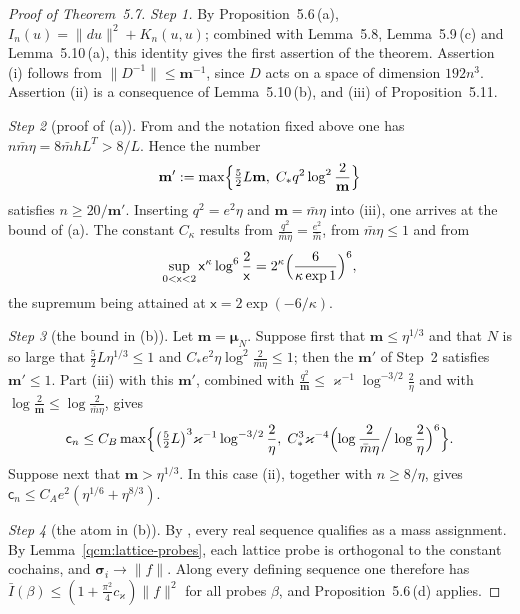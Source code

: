 \documentclass[11pt,letterpaper,reqno]{amsart}
\theoremstyle{definition}
\begin{document}
\begin{proof}[Proof of Theorem~5.7]
\emph{Step 1.}
By Proposition~5.6\,(a), $I_n(u)=\|du\|^2+K_n(u,u)$; combined with Lemma~5.8, Lemma~5.9\,(c) and Lemma~5.10\,(a), this identity gives the first assertion of the theorem.
Assertion (i) follows from $\|D^{-1}\|\le\mathbf m^{-1}$, since $D$ acts on a space of dimension $192n^3$.
Assertion (ii) is a consequence of Lemma~5.10\,(b), and (iii) of Proposition~5.11.

\emph{Step 2} (proof of (a)).
From \cite[Section~6.1]{QEDConstruction} and the notation fixed above one has $n\bar m\eta=8\bar mhL^T>8/L$.
Hence the number
\begin{equation*}
\mathbf m':=\max\Bigl\{\tfrac52L\mathbf m,\;C_*q^2\log^2\frac2{\mathbf m}\Bigr\}
\end{equation*}
satisfies $n\ge20/\mathbf m'$.
Inserting $q^2=e^2\eta$ and $\mathbf m=\bar m\eta$ into (iii), one arrives at the bound of (a).
The constant $C_\kappa$ results from $\frac{q^2}{\bar m\eta}=\frac{e^2}{\bar m}$, from $\bar m\eta\le1$ and from
\begin{equation*}
\sup_{0<\mathsf x<2}\mathsf x^\kappa\log^6\frac2{\mathsf x}=2^\kappa\Bigl(\frac{6}{\kappa\exp1}\Bigr)^6,
\end{equation*}
the supremum being attained at $\mathsf x=2\exp(-6/\kappa)$.

\emph{Step 3} (the bound in (b)).
Let $\mathbf m=\boldsymbol\mu_N$.
Suppose first that $\mathbf m\le\eta^{1/3}$ and that $N$ is so large that $\frac52L\eta^{1/3}\le1$ and $C_*e^2\eta\log^2\frac2{\bar m\eta}\le1$; then the $\mathbf m'$ of Step~2 satisfies $\mathbf m'\le1$.
Part (iii) with this $\mathbf m'$, combined with $\frac{q^2}{\mathbf m}\le\varkappa^{-1}\log^{-3/2}\frac2\eta$ and with $\log\frac2{\mathbf m}\le\log\frac2{\bar m\eta}$, gives
\begin{equation*}
\mathsf c_n\le C_B\max\Bigl\{\bigl(\tfrac52L\bigr)^3\varkappa^{-1}\log^{-3/2}\frac2\eta,\;C_*^3\varkappa^{-4}\Bigl(\log\frac2{\bar m\eta}\Big/\log\frac2\eta\Bigr)^6\Bigr\}.
\end{equation*}
Suppose next that $\mathbf m>\eta^{1/3}$.
In this case (ii), together with $n\ge8/\eta$, gives $\mathsf c_n\le C_Ae^2(\eta^{1/6}+\eta^{8/3})$.

\emph{Step 4} (the atom in (b)).
By \cite[Section~6.1]{QEDConstruction}, every real sequence qualifies as a mass assignment.
By Lemma~\ref{qcm:lattice-probes}, each lattice probe is orthogonal to the constant cochains, and $\boldsymbol\sigma_i\to\|f\|$.
Along every defining sequence one therefore has $\bar I(\beta)\le(1+\frac{\pi^2}{4}c_\varkappa)\|f\|^2$ for all probes $\beta$, and Proposition~5.6\,(d) applies.


\end{proof}
\end{document}
